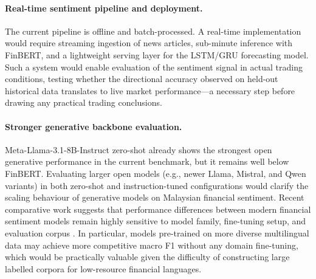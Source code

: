 \documentclass[12pt]{ucetd}
\begin{document}
\paragraph{Real-time sentiment pipeline and deployment.}
The current pipeline is offline and batch-processed. A real-time implementation would require streaming ingestion of news articles, sub-minute inference with FinBERT, and a lightweight serving layer for the LSTM/GRU forecasting model. Such a system would enable evaluation of the sentiment signal in actual trading conditions, testing whether the directional accuracy observed on held-out historical data translates to live market performance---a necessary step before drawing any practical trading conclusions.

\paragraph{Stronger generative backbone evaluation.}
Meta-Llama-3.1-8B-Instruct zero-shot already shows the strongest open generative performance in the current benchmark, but it remains well below FinBERT. Evaluating larger open models (e.g., newer Llama, Mistral, and Qwen variants) in both zero-shot and instruction-tuned configurations would clarify the scaling behaviour of generative models on Malaysian financial sentiment. Recent comparative work suggests that performance differences between modern financial sentiment models remain highly sensitive to model family, fine-tuning setup, and evaluation corpus \cite{shobayo2024innovative, nasiopoulos2025financial}. In particular, models pre-trained on more diverse multilingual data may achieve more competitive macro F1 without any domain fine-tuning, which would be practically valuable given the difficulty of constructing large labelled corpora for low-resource financial languages.




\makebibliography
\nocite{*}

%
%
\end{document}

